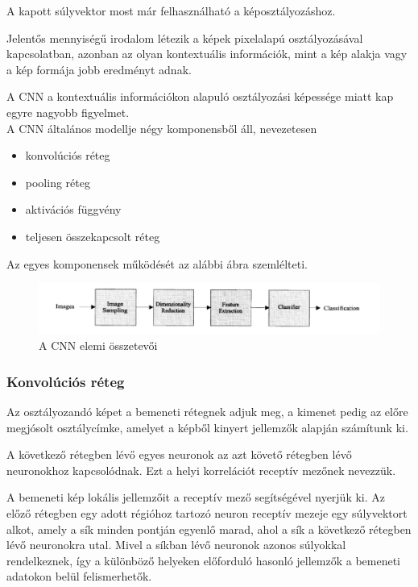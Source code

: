 \documentclass[12pt,a4]{article}
\begin{document}
	A kapott súlyvektor most már felhasználható a képosztályozáshoz.
	
	Jelentős mennyiségű irodalom létezik a képek pixelalapú osztályozásával
	kapcsolatban, azonban az olyan kontextuális információk, mint a kép alakja vagy 
	a kép formája jobb eredményt adnak.
	
	A CNN a kontextuális információkon alapuló osztályozási képessége miatt kap egyre nagyobb figyelmet.\\
	
	
	A CNN általános modellje négy komponensből áll, nevezetesen 
	\begin{itemize}
		\item konvolúciós réteg
		\item pooling réteg
		\item aktivációs függvény
		\item teljesen összekapcsolt réteg
	\end{itemize}
	Az egyes komponensek működését az alábbi ábra szemlélteti.
	
	\begin{figure}[h]	
		\centering
		\includegraphics[width=1\linewidth]{element}
		\caption{\cite{CNN} A CNN elemi összetevői}
	\end{figure}

	
	\subsubsection{Konvolúciós réteg}
	
	\cite{CNN}Az osztályozandó képet a bemeneti rétegnek adjuk meg, a kimenet pedig az előre megjósolt osztálycímke, amelyet a képből kinyert jellemzők alapján számítunk ki.
	
	
	A következő rétegben lévő egyes neuronok az azt követő rétegben lévő neuronokhoz kapcsolódnak. Ezt a helyi korrelációt receptív mezőnek nevezzük.
	
	
	A bemeneti kép lokális jellemzőit a receptív mező segítségével nyerjük ki. Az előző rétegben egy adott régióhoz tartozó neuron receptív mezeje egy súlyvektort alkot, amely a sík minden pontján egyenlő marad, ahol a sík a következő rétegben lévő neuronokra utal. Mivel a síkban lévő neuronok azonos súlyokkal rendelkeznek, így a különböző helyeken előforduló hasonló jellemzők a bemeneti adatokon belül felismerhetők.
	
\end{document}
